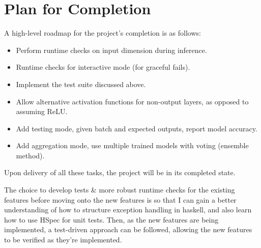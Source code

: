 \documentclass[12pt]{article}
\begin{document}
\section{Plan for Completion}
A high-level roadmap for the project's completion is as follows:
\begin{itemize}
	\item Perform runtime checks on input dimension during inference.
	\item Runtime checks for interactive mode (for graceful fails).
	\item Implement the test suite discussed above.
	\item Allow alternative activation functions for non-output layers, as opposed to assuming ReLU.
	\item Add testing mode, given batch and expected outputs, report model accuracy.
	\item Add aggregation mode, use multiple trained models with voting (ensemble method).
\end{itemize}
Upon delivery of all these tasks, the project will be in its completed state.\bigskip

The choice to develop tests \& more robust runtime checks for the existing features before moving onto the new features is so that I can gain a better understanding of how to structure exception handling in haskell, and also learn how to use HSpec for unit tests. Then, as the new features are being implemented, a test-driven approach can be followed, allowing the new features to be verified as they're implemented.
\end{document}
